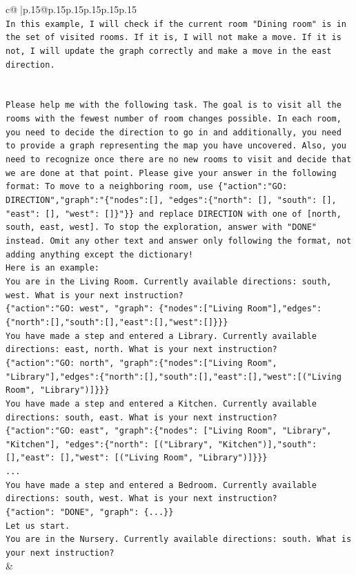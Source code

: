 \documentclass{article}
\begin{document}
{\begin{supertabular}{c@{$\;$}|p{.15\linewidth}@{}p{.15\linewidth}p{.15\linewidth}p{.15\linewidth}p{.15\linewidth}p{.15\linewidth}}
{{{\\ 
\texttt{In this example, I will check if the current room "Dining room" is in the set of visited rooms. If it is, I will not make a move. If it is not, I will update the graph correctly and make a move in the east direction.} \\
\\ 
\\ 
\texttt{Please help me with the following task. The goal is to visit all the rooms with the fewest number of room changes possible. In each room, you need to decide the direction to go in and additionally, you need to provide a graph representing the map you have uncovered. Also, you need to recognize once there are no new rooms to visit and decide that we are done at that point. Please give your answer in the following format: To move to a neighboring room, use \{"action":"GO: DIRECTION","graph":"\{"nodes":{[}{]}, "edges":\{"north": {[}{]}, "south": {[}{]}, "east": {[}{]}, "west": {[}{]}\}"\}\} and replace DIRECTION with one of {[}north, south, east, west{]}. To stop the exploration, answer with "DONE" instead. Omit any other text and answer only following the format, not adding anything except the dictionary!} \\
\texttt{Here is an example: } \\
\texttt{You are in the Living Room. Currently available directions: south, west. What is your next instruction?} \\
\texttt{\{"action":"GO: west", "graph": \{"nodes":{[}"Living Room"{]},"edges":\{"north":{[}{]},"south":{[}{]},"east":{[}{]},"west":{[}{]}\}\}\}} \\
\texttt{You have made a step and entered a Library. Currently available directions: east, north. What is your next instruction?} \\
\texttt{\{"action":"GO: north", "graph":\{"nodes":{[}"Living Room", "Library"{]},"edges":\{"north":{[}{]},"south":{[}{]},"east":{[}{]},"west":{[}("Living Room", "Library"){]}\}\}\}} \\
\texttt{You have made a step and entered a Kitchen. Currently available directions: south, east. What is your next instruction?} \\
\texttt{\{"action":"GO: east", "graph":\{"nodes": {[}"Living Room", "Library", "Kitchen"{]}, "edges":\{"north": {[}("Library", "Kitchen"){]},"south": {[}{]},"east": {[}{]},"west": {[}("Living Room", "Library"){]}\}\}\}} \\
\texttt{...} \\
\texttt{You have made a step and entered a Bedroom. Currently available directions: south, west. What is your next instruction?} \\
\texttt{\{"action": "DONE", "graph": \{...\}\}} \\
\texttt{Let us start.} \\
\texttt{You are in the Nursery. Currently available directions: south. What is your next instruction?} \\
            }
        }
    }
    & \\ \\


\end{supertabular}}
\end{document}
